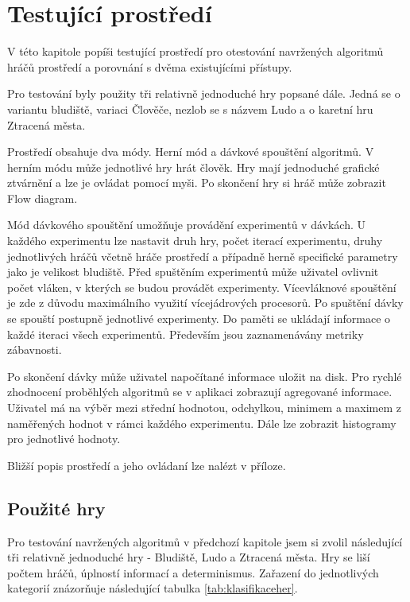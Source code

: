 \chapter{Testující prostředí}

V této kapitole popíši testující prostředí pro otestování navržených algoritmů hráčů prostředí a porovnání s dvěma existujícími přístupy.

Pro testování byly použity tři relativně jednoduché hry popsané dále. Jedná se o variantu bludiště, variaci Člověče, nezlob se s názvem Ludo a o karetní hru Ztracená města.

Prostředí obsahuje dva módy. Herní mód a dávkové spouštění algoritmů. V herním módu může jednotlivé hry hrát člověk. Hry mají jednoduché grafické ztvárnění a lze je ovládat pomocí myši. Po skončení hry si hráč může zobrazit Flow diagram.

Mód dávkového spouštění umožňuje provádění experimentů v dávkách. U každého experimentu lze nastavit druh hry, počet iterací experimentu, druhy jednotlivých hráčů včetně hráče prostředí a případně herně specifické parametry jako je velikost bludiště. Před spuštěním experimentů může uživatel ovlivnit počet vláken, v kterých se budou provádět experimenty. Vícevláknové spouštění je zde z důvodu maximálního využití vícejádrových procesorů. Po spuštění dávky se spouští postupně jednotlivé experimenty. Do paměti se ukládají informace o každé iteraci všech experimentů. Především jsou zaznamenávány metriky zábavnosti. 

Po skončení dávky může uživatel napočítané informace uložit na disk. Pro rychlé zhodnocení proběhlých algoritmů se v aplikaci zobrazují agregované informace. Uživatel má na výběr mezi střední hodnotou, odchylkou, minimem a maximem z naměřených hodnot v rámci každého experimentu. Dále lze zobrazit histogramy pro jednotlivé hodnoty.

Bližší popis prostředí a jeho ovládaní lze nalézt v příloze.

\section{Použité hry}

Pro testování navržených algoritmů v předchozí kapitole jsem si zvolil následující tři relativně jednoduché hry - Bludiště, Ludo a Ztracená města. Hry se liší počtem hráčů, úplností informací a determinismus. Zařazení do jednotlivých kategorií znázorňuje následující tabulka \ref{tab:klasifikaceher}.

